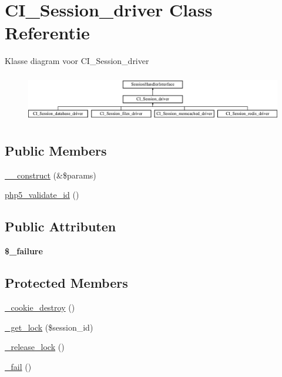 \hypertarget{class_c_i___session__driver}{}\section{C\+I\+\_\+\+Session\+\_\+driver Class Referentie}
\label{class_c_i___session__driver}
Klasse diagram voor C\+I\+\_\+\+Session\+\_\+driver\begin{figure}[H]
\begin{center}
\leavevmode
\includegraphics[height=2.121212cm]{class_c_i___session__driver}
\end{center}
\end{figure}
\subsection*{Public Members}
\begin{DoxyCompactItemize}
\item 
\mbox{\hyperlink{class_c_i___session__driver_ac1669c73d53d6f16cf5459a1e84d39c8}{\+\_\+\+\_\+construct}} (\&\$params)
\item 
\mbox{\hyperlink{class_c_i___session__driver_ae2d4c0f64a46de5c8f8db759478f3a5f}{php5\+\_\+validate\+\_\+id}} ()
\end{DoxyCompactItemize}
\subsection*{Public Attributen}
\begin{DoxyCompactItemize}
\item 
\mbox{\label{class_c_i___session__driver_af597a603db9347ef534b97834ed272a8}} 
{\bfseries \$\+\_\+failure}
\end{DoxyCompactItemize}
\subsection*{Protected Members}
\begin{DoxyCompactItemize}
\item 
\mbox{\hyperlink{class_c_i___session__driver_a36771b622e8a8928c1c931ac56c12434}{\+\_\+cookie\+\_\+destroy}} ()
\item 
\mbox{\hyperlink{class_c_i___session__driver_a2c49c8e23be3e2aca96a9d20de18ffc2}{\+\_\+get\+\_\+lock}} (\$session\+\_\+id)
\item 
\mbox{\hyperlink{class_c_i___session__driver_a0265e356e6cf1eaba229663c1664c37d}{\+\_\+release\+\_\+lock}} ()
\item 
\mbox{\hyperlink{class_c_i___session__driver_a1b1bf5bb9cba50e84f985c30f6b64773}{\+\_\+fail}} ()
\end{DoxyCompactItemize}

